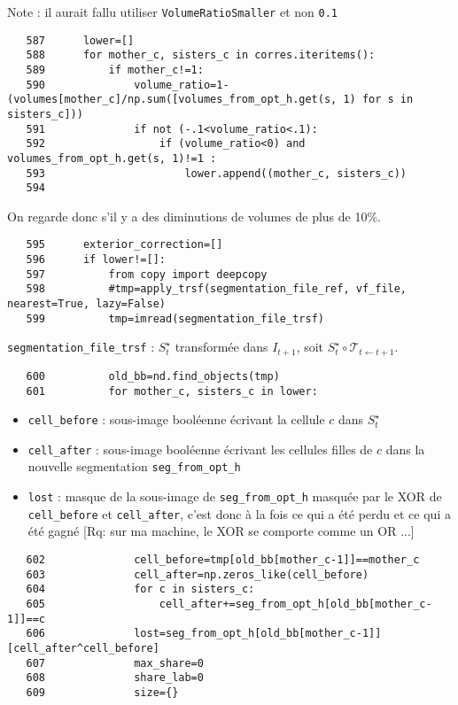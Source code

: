 \documentclass{article}
\def \mycolor {red}
\begin{document}
Note : il aurait fallu utiliser \verb|VolumeRatioSmaller| et non \verb|0.1|
\color{black}
\begin{verbatim}
   587	    lower=[]
   588	    for mother_c, sisters_c in corres.iteritems():
   589	        if mother_c!=1:
   590	            volume_ratio=1-(volumes[mother_c]/np.sum([volumes_from_opt_h.get(s, 1) for s in sisters_c]))
   591	            if not (-.1<volume_ratio<.1):
   592	                if (volume_ratio<0) and volumes_from_opt_h.get(s, 1)!=1 :
   593	                    lower.append((mother_c, sisters_c))
   594	    
\end{verbatim} 
\color{\mycolor}
On regarde donc s'il y a des diminutions de volumes de plus de 10\%.
\color{black}
\begin{verbatim}
   595	    exterior_correction=[]
   596	    if lower!=[]:
   597	        from copy import deepcopy
   598	        #tmp=apply_trsf(segmentation_file_ref, vf_file, nearest=True, lazy=False)
   599	        tmp=imread(segmentation_file_trsf)
\end{verbatim} 
\color{\mycolor}
\verb|segmentation_file_trsf| : $S^{\star}_t$ transform\'ee dans $I_{t+1}$, soit $S^{\star}_t \circ \mathcal{T}_{t \leftarrow t+1}$.   
\color{black}
\begin{verbatim}
   600	        old_bb=nd.find_objects(tmp)
   601	        for mother_c, sisters_c in lower:
\end{verbatim} 
\color{\mycolor}
\begin{itemize}
\itemsep -1ex
\item \verb|cell_before| : sous-image bool\'eenne \'ecrivant la cellule $c$ dans $S^{\star}_t$ 
\item \verb|cell_after| : sous-image bool\'eenne \'ecrivant les cellules filles de  $c$ dans la nouvelle segmentation \verb|seg_from_opt_h|
\item \verb|lost| : masque de la sous-image de \verb|seg_from_opt_h| masqu\'ee par le  XOR de  \verb|cell_before| et \verb|cell_after|, c'est donc \`a la fois ce qui a \'et\'e perdu et ce qui a \'et\'e gagn\'e [Rq: sur ma machine, le XOR se comporte comme un OR ...]
\end{itemize}
\color{black}
\begin{verbatim}
   602	            cell_before=tmp[old_bb[mother_c-1]]==mother_c
   603	            cell_after=np.zeros_like(cell_before)
   604	            for c in sisters_c:
   605	                cell_after+=seg_from_opt_h[old_bb[mother_c-1]]==c
   606	            lost=seg_from_opt_h[old_bb[mother_c-1]][cell_after^cell_before]
   607	            max_share=0
   608	            share_lab=0
   609	            size={}
\end{verbatim} 
\end{document}
